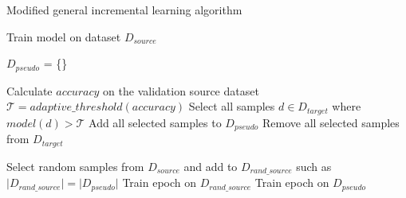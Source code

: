 \documentclass{article}
\newcommand{\threshold}{\mathcal{T}}
\begin{document}
	\begin{algorithm}
		\caption{Modified general incremental learning algorithm} 
		\label{al::modified-ican}
		\begin{algorithmic}[1]	
			\State Train model on dataset $D_{source}$
			
			\State $D_{pseudo}$ = \{\}
			
					\State Calculate $accuracy$ on the validation source dataset
					\State $\threshold = adaptive\_threshold(accuracy)$
					\State Select all samples $d \in D_{target}$ where $model(d) > \threshold$
					\State Add all selected samples to $D_{pseudo}$
					\State Remove all selected samples from $D_{target}$
				\EndIf
				
				\State Select random samples from $D_{source}$ and add to $D_{rand\_source}$ such as $\lvert D_{rand\_source} \rvert = \lvert D_{pseudo} \rvert$
				\State Train epoch on $D_{rand\_source}$
				\State Train epoch on $D_{pseudo}$
			\EndFor
			
		\end{algorithmic} 
	\end{algorithm}

	
\end{document}
